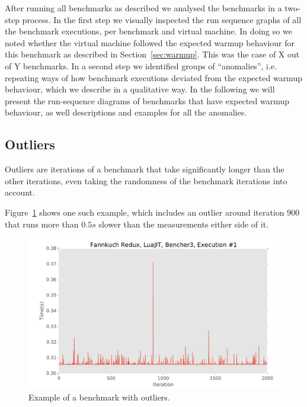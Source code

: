\documentclass[a4paper,UKenglish]{lipics}
\begin{document}

After running all benchmarks as described we analysed the benchmarks in a
two-step process. In the first step we visually inspected the run sequence
graphs of all the benchmark executions, per benchmark and virtual machine. In
doing so we noted whether the virtual machine followed the expected warmup
behaviour for this benchmark as described in Section~\ref{sec:warmup}. This was
the case of  X out of Y benchmarks. In a second step we
identified groups of ``anomalies'', i.e. repeating ways of how benchmark
executions deviated from the expected warmup behaviour, which we describe in a
qualitative way. In the following we will
present the run-sequence diagrams of benchmarks that have expected warmup
behaviour, as well descriptions and examples for all the anomalies.




\subsection{Outliers}
\label{sub:outliers}

Outliers are iterations of a benchmark that take significantly longer than the
other iterations, even taking the randomness of the benchmark iterations into
account.

Figure~\ref{fig:examples:outliers1} shows one such example, which includes an
outlier around iteration $900$ that runs more than $0.5s$ slower than the
measurements either side of it.

\begin{figure}[h!]
\centering
\includegraphics[width=.46\textwidth]{examples/outliers1}
\caption{Example of a benchmark with outliers.}
\label{fig:examples:outliers1}
\end{figure}
\end{document}
